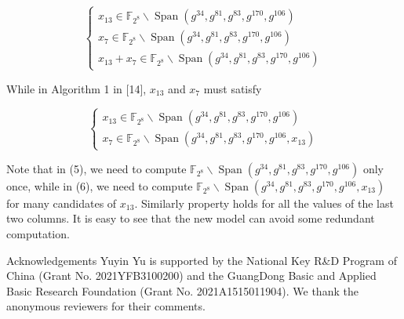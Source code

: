 \documentclass[10pt]{article}
\begin{document}
\[
\left\{\begin{array}{l}
x_{13} \in \mathbb{F}_{2^{8}} \backslash \operatorname{Span}\left(g^{34}, g^{81}, g^{83}, g^{170}, g^{106}\right)  \tag{5}\\
x_{7} \in \mathbb{F}_{2^{8}} \backslash \operatorname{Span}\left(g^{34}, g^{81}, g^{83}, g^{170}, g^{106}\right) \\
x_{13}+x_{7} \in \mathbb{F}_{2^{8}} \backslash \operatorname{Span}\left(g^{34}, g^{81}, g^{83}, g^{170}, g^{106}\right)
\end{array}\right.
\]

While in Algorithm 1 in [14], $x_{13}$ and $x_{7}$ must satisfy

\[
\left\{\begin{array}{l}
x_{13} \in \mathbb{F}_{2^{8}} \backslash \operatorname{Span}\left(g^{34}, g^{81}, g^{83}, g^{170}, g^{106}\right)  \tag{6}\\
x_{7} \in \mathbb{F}_{2^{8}} \backslash \operatorname{Span}\left(g^{34}, g^{81}, g^{83}, g^{170}, g^{106}, x_{13}\right)
\end{array}\right.
\]

Note that in (5), we need to compute $\mathbb{F}_{2^{8}} \backslash \operatorname{Span}\left(g^{34}, g^{81}, g^{83}, g^{170}, g^{106}\right)$ only once, while in (6), we need to compute $\mathbb{F}_{2^{8}} \backslash \operatorname{Span}\left(g^{34}, g^{81}, g^{83}, g^{170}, g^{106}, x_{13}\right)$ for many candidates of $x_{13}$. Similarly property holds for all the values of the last two columns. It is easy to see that the new model can avoid some redundant computation.

Acknowledgements Yuyin Yu is supported by the National Key R\&D Program of China (Grant No. 2021YFB3100200) and the GuangDong Basic and Applied Basic Research Foundation (Grant No. 2021A1515011904). We thank the anonymous reviewers for their comments.
\end{document}
